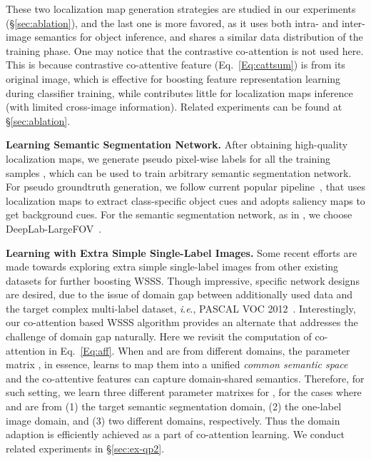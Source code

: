 \documentclass[runningheads]{llncs}
\newcommand{\ie}{\textit{i}.\textit{e}.}
\begin{document}
These two localization map generation strategies are studied in our experiments (\S\ref{sec:ablation}), and the last one is more favored, as it uses both intra- and inter-image semantics for object inference, and shares a similar data distribution of the training phase. One may notice that the contrastive co-attention is not used here. This is because contrastive co-attentive feature (Eq.~\ref{Eq:cattsum}) is from its original image, which is effective for boosting feature representation learning during classifier training, while contributes little for localization maps inference (with limited cross-image information). Related experiments can be found at \S\ref{sec:ablation}.

\noindent\textbf{Learning Semantic Segmentation Network.} After obtaining high-quality localization maps, we generate pseudo pixel-wise labels for all the training samples , which can be used to train arbitrary semantic segmentation network. For pseudo groundtruth generation, we follow current popular pipeline~\cite{lee2019frame,lee2019ficklenet,oaa2019,hou2018self,dsrg2018,zeng2019joint}, that uses localization maps to extract class-specific object cues and adopts saliency maps \cite{HouPami19Dss,poolnet} to get background cues. For the semantic segmentation network, as in \cite{lee2019frame,lee2019ficklenet,oaa2019,hou2018self}, we choose DeepLab-LargeFOV~\cite{chen2017deeplab}.


\noindent\textbf{Learning with Extra Simple Single-Label Images.}  Some recent efforts \cite{pinheiro2015image,li2019attention}  are made towards exploring extra simple single-label images from other existing datasets \cite{russakovsky2015imagenet,griffin2007caltech} for further boosting WSSS. Though impressive, specific network designs are desired, due to the issue of domain gap between additionally used data and the target complex multi-label dataset, \ie, PASCAL VOC 2012~\cite{everingham2015pascal}. Interestingly, our co-attention based WSSS algorithm provides an alternate that addresses the challenge of domain gap naturally. Here we revisit the computation of co-attention in Eq.~\ref{Eq:aff}.
When  and  are from different domains, the parameter matrix , in essence, learns to map them into a unified \textit{common semantic space}~\cite{an2020adversarial} and the co-attentive features can capture domain-shared semantics.  Therefore, for such setting, we learn three different parameter matrixes for , for the cases where   and  are from (1) the target semantic segmentation domain, (2) the one-label image domain, and (3) two different domains, respectively. Thus the domain adaption is efficiently achieved as a part of co-attention learning. We conduct related experiments in \S\ref{sec:ex-qp2}.
\end{document}
